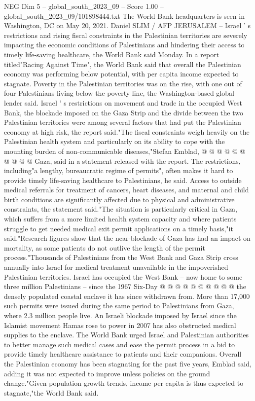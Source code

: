 \begin{textsample}{NEG Dim 5 – global\_south\_2023\_09 – Score 1.00 – global\_south\_2023\_09/101898444.txt}  \label{ex:f5_neg_003}
The World Bank headquarters is seen in Washington, DC on May 20, 2021.
Daniel SLIM / AFP JERUSALEM -- Israel ' s restrictions and rising fiscal constraints in the Palestinian territories are severely impacting the economic conditions of Palestinians and hindering their access to timely life-saving healthcare, the World Bank said Monday.
In a report titled"Racing Against Time", the World Bank said that overall the Palestinian economy was performing below potential, with per capita income expected to stagnate.
Poverty in the Palestinian territories was on the rise, with one out of four Palestinians living below the poverty line, the Washington-based global lender said.
Israel ' s restrictions on movement and trade in the occupied West Bank, the blockade imposed on the Gaza Strip and the divide between the two Palestinian territories were among several factors that had put the Palestinian economy at high risk, the report said."The fiscal constraints weigh heavily on the Palestinian health system and particularly on its ability to cope with the mounting burden of non-communicable diseases,"Stefan Emblad, @ @ @ @ @ @ @ @ @ @ Gaza, said in a statement released with the report.
The restrictions, including"a lengthy, bureaucratic regime of permits", often makes it hard to provide timely life-saving healthcare to Palestinians, he said.
Access to outside medical referrals for treatment of cancers, heart diseases, and maternal and child birth conditions are significantly affected due to physical and administrative constraints, the statement said."The situation is particularly critical in Gaza, which suffers from a more limited health system capacity and where patients struggle to get needed medical exit permit applications on a timely basis,"it said."Research figures show that the near-blockade of Gaza has had an impact on mortality, as some patients do not outlive the length of the permit process."Thousands of Palestinians from the West Bank and Gaza Strip cross annually into Israel for medical treatment unavailable in the impoverished Palestinian territories.
Israel has occupied the West Bank -- now home to some three million Palestinians -- since the 1967 Six-Day @ @ @ @ @ @ @ @ @ @ the densely populated coastal enclave it has since withdrawn from.
More than 17,000 such permits were issued during the same period to Palestinians from Gaza, where 2.3 million people live.
An Israeli blockade imposed by Israel since the Islamist movement Hamas rose to power in 2007 has also obstructed medical supplies to the enclave.
The World Bank urged Israel and Palestinian authorities to better manage such medical cases and ease the permit process in a bid to provide timely healthcare assistance to patients and their companions.
Overall the Palestinian economy has been stagnating for the past five years, Emblad said, adding it was not expected to improve unless policies on the ground change."Given population growth trends, income per capita is thus expected to stagnate,"the World Bank said.

\end{textsample}
